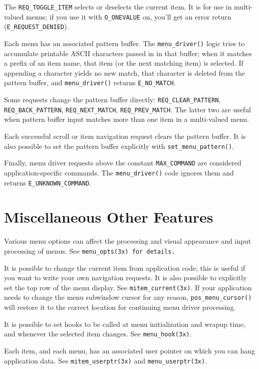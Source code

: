 The \texttt{REQ\_TOGGLE\_ITEM} selects or deselects the current item.
It is for use in multi-valued menus; if you use it with \texttt{O\_ONEVALUE}
on, you'll get an error return (\texttt{E\_REQUEST\_DENIED}). 

Each menu has an associated pattern buffer.  The
\texttt{menu\_driver()} logic tries to accumulate printable ASCII
characters passed in in that buffer; when it matches a prefix of an
item name, that item (or the next matching item) is selected.  If
appending a character yields no new match, that character is deleted
from the pattern buffer, and \texttt{menu\_driver()} returns
\texttt{E\_NO\_MATCH}. 

Some requests change the pattern buffer directly:
\texttt{REQ\_CLEAR\_PATTERN}, \texttt{REQ\_BACK\_PATTERN},
\texttt{REQ\_NEXT\_MATCH}, \texttt{REQ\_PREV\_MATCH}.  The latter
two are useful when pattern buffer input matches more than one item
in a multi-valued menu. 

Each successful scroll or item navigation request clears the pattern
buffer.  It is also possible to set the pattern buffer explicitly
with \texttt{set\_menu\_pattern()}. 

Finally, menu driver requests above the constant \texttt{MAX\_COMMAND}
are considered application-specific commands.  The \texttt{menu\_driver()}
code ignores them and returns \texttt{E\_UNKNOWN\_COMMAND}.

\section{Miscellaneous Other Features}

\label{f0:mmisc}Various menu options can affect the processing and visual appearance
and input processing of menus.  See \texttt{menu\_opts(3x) for
details.} 

It is possible to change the current item from application code; this
is useful if you want to write your own navigation requests.  It is
also possible to explicitly set the top row of the menu display.  See
\texttt{mitem\_current(3x)}.
If your application needs to change the menu subwindow cursor for
any reason, \texttt{pos\_menu\_cursor()} will restore it to the
correct location for continuing menu driver processing. 

It is possible to set hooks to be called at menu initialization and
wrapup time, and whenever the selected item changes.  See
\texttt{menu\_hook(3x)}. 

Each item, and each menu, has an associated user pointer on which you
can hang application data.  See \texttt{mitem\_userptr(3x)} and
\texttt{menu\_userptr(3x)}.

